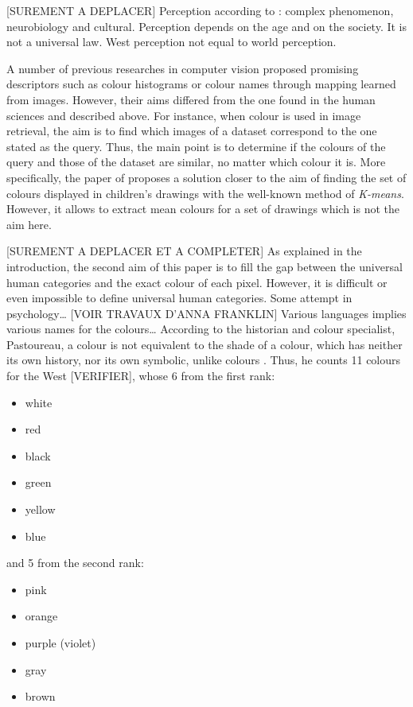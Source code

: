 \documentclass[11pt,a4paper]{article}
\begin{document}
{[}SUREMENT A DEPLACER{]} Perception according to
\cite[][p. 35 and p.87]{pastoureau2017}: complex phenomenon,
neurobiology and cultural. Perception depends on the age and on the
society. It is not a universal law. West perception not equal to world
perception.

A number of previous researches in computer vision proposed promising
descriptors such as colour histograms \cite{sun2006} or colour names
\cite{weijer2009, lindner2013} through mapping learned from images.
However, their aims differed from the one found in the human sciences
and described above. For instance, when colour is used in image
retrieval, the aim is to find which images of a dataset correspond to
the one stated as the query. Thus, the main point is to determine if the
colours of the query and those of the dataset are similar, no matter
which colour it is. More specifically, the paper of
\cite{konyushkova2015} proposes a solution closer to the aim of finding
the set of colours displayed in children's drawings with the well-known
method of \emph{K-means}. However, it allows to extract mean colours for
a set of drawings which is not the aim here.

{[}SUREMENT A DEPLACER ET A COMPLETER{]} As explained in the
introduction, the second aim of this paper is to fill the gap between
the universal human categories and the exact colour of each pixel.
However, it is difficult or even impossible to define universal human
categories. Some attempt in psychology\ldots{} {[}VOIR TRAVAUX D'ANNA
FRANKLIN{]} Various languages implies various names for the
colours\ldots{} According to the historian and colour specialist,
Pastoureau, a colour is not equivalent to the shade of a colour, which
has neither its own history, nor its own symbolic, unlike colours
\cite[][p. 12 and p. 63]{pastoureau2017}. Thus, he counts 11 colours for
the West {[}VERIFIER{]}, whose 6 from the first rank:

\begin{itemize}
\item
  white
\item
  red
\item
  black
\item
  green
\item
  yellow
\item
  blue
\end{itemize}

and 5 from the second rank:

\begin{itemize}
\item
  pink
\item
  orange
\item
  purple (violet)
\item
  gray
\item
  brown
\end{itemize}
\end{document}

